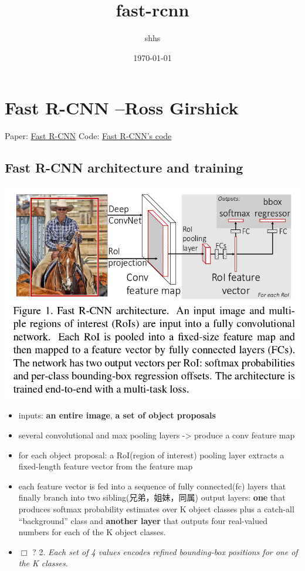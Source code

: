 \documentclass[11pt]{article}
\title{fast-rcnn}
\author{shhs}
\date{\today}
\begin{document}
\maketitle

\setcounter{tocdepth}{3}
\tableofcontents
\vspace*{1cm}

\section{Fast R-CNN --Ross Girshick}
\label{sec-1}


Paper: \href{http://arxiv.org/abs/1504.08083}{Fast R-CNN}
Code: \href{https://github.com/rbgirshick/fast-rcnn}{Fast R-CNN's code}
\subsection{Fast R-CNN architecture and training}
\label{sec-1-1}


   \includegraphics[width=.9\linewidth]{./pic_fast_rcnn/1.png}
\begin{itemize}
\item inputs: \textbf{an entire image}, \textbf{a set of object proposals}
\item several convolutional and max pooling layers -> produce a conv feature map
\item for each object proposal: a RoI(region of interest) pooling layer extracts a 
     fixed-length feature vector from the feature map
\item each feature vector is fed into a sequence of fully connected(fc) layers 
     that finally branch into two sibling(兄弟，姐妹，同属) output layers:
     \textbf{one} that produces softmax probability estimates over K object classes
     plus a catch-all ``background'' class and \textbf{another layer} that outputs 
     four real-valued numbers for each of the K object classes.
\item $\Box$ ? 2. \emph{Each set of 4 values encodes refined bounding-box positions for one of            the K classes.}
\end{itemize}
\end{document}
